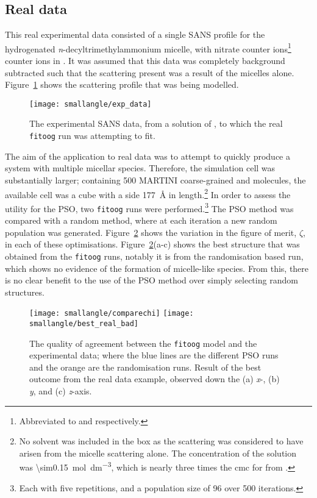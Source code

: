 \subsection{Real data}
\label{sec:real_data}
This real experimental data consisted of a single SANS profile for the hydrogenated \emph{n}-decyltrimethylammonium micelle, with nitrate counter ions\footnote{Abbreviated to  and  respectively.} counter ions in .
It was assumed that this data was completely background subtracted such that the scattering present was a result of the micelles alone.
Figure~\ref{fig:expdata} shows the scattering profile that was being modelled.
%
\begin{figure}[t]
    \centering
    \texttt{[image: smallangle/exp\_data]}
    \caption{The experimental SANS data, from a solution of , to which the real \texttt{fitoog} run was attempting to fit.}
    \label{fig:expdata}
\end{figure}
%

The aim of the application to real data was to attempt to quickly produce a system with multiple micellar species.
Therefore, the simulation cell was substantially larger; containing 500 MARTINI coarse-grained  and  molecules, the available cell was a cube with a side \SI{177}{\angstrom} in length.\footnote{No solvent was included in the box as the scattering was considered to have arisen from the micelle scattering alone. The concentration of the solution was \SI{\sim0.15}{\mol\deci\meter^{-3}}, which is nearly three times the cmc for  from \cite{rodriguez_surface_2007}.}
In order to assess the utility for the PSO, two \texttt{fitoog} runs were performed.\footnote{Each with five repetitions, and a population size of 96 over 500 iterations.}
The PSO method was compared with a random method, where at each iteration a new random population was generated.
Figure~\ref{fig:chi} shows the variation in the figure of merit, $\zeta$, in each of these optimisations.
Figure~\ref{fig:chi}(a-c) shows the best structure that was obtained from the \texttt{fitoog} runs, notably it is from the randomisation based run, which shows no evidence of the formation of micelle-like species.
From this, there is no clear benefit to the use of the PSO method over simply selecting random structures.
%
\begin{figure}
    \centering
    \texttt{[image: smallangle/comparechi]}
    \texttt{[image: smallangle/best\_real\_bad]}
    \caption{The quality of agreement between the \texttt{fitoog} model and the experimental data; where the blue lines are the different PSO runs and the orange are the randomisation runs. Result of the best outcome from the real data example, observed down the (a) \emph{x}-, (b) \emph{y}, and (c) \emph{z}-axis.}
    \label{fig:chi}
\end{figure}
%

